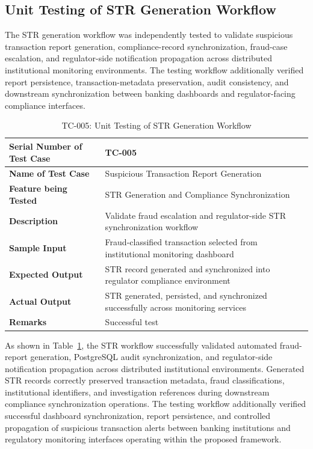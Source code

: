 \subsection[Unit Testing of STR Generation Workflow]{\textbf{Unit Testing of STR Generation Workflow}}

The STR generation workflow was independently tested to validate suspicious transaction report generation, compliance-record synchronization, fraud-case escalation, and regulator-side notification propagation across distributed institutional monitoring environments. The testing workflow additionally verified report persistence, transaction-metadata preservation, audit consistency, and downstream synchronization between banking dashboards and regulator-facing compliance interfaces.


\begin{table}[H]
\centering
\caption{TC-005: Unit Testing of STR Generation Workflow}
\label{tab:str_generation_test}
\vspace{0.2cm}

\begin{tabular}{|p{4.2cm}|p{9cm}|}
\hline
\textbf{Serial Number of Test Case} & TC-005 \\ \hline
\textbf{Name of Test Case} & Suspicious Transaction Report Generation \\ \hline
\textbf{Feature being Tested} & STR Generation and Compliance Synchronization \\ \hline
\textbf{Description} & Validate fraud escalation and regulator-side STR synchronization workflow \\ \hline
\textbf{Sample Input} & Fraud-classified transaction selected from institutional monitoring dashboard \\ \hline
\textbf{Expected Output} & STR record generated and synchronized into regulator compliance environment \\ \hline
\textbf{Actual Output} & STR generated, persisted, and synchronized successfully across monitoring services \\ \hline
\textbf{Remarks} & Successful test \\ \hline
\end{tabular}
\end{table}


As shown in Table~\ref{tab:str_generation_test}, the STR workflow successfully validated automated fraud-report generation, PostgreSQL audit synchronization, and regulator-side notification propagation across distributed institutional environments. Generated STR records correctly preserved transaction metadata, fraud classifications, institutional identifiers, and investigation references during downstream compliance synchronization operations. The testing workflow additionally verified successful dashboard synchronization, report persistence, and controlled propagation of suspicious transaction alerts between banking institutions and regulatory monitoring interfaces operating within the proposed framework.

